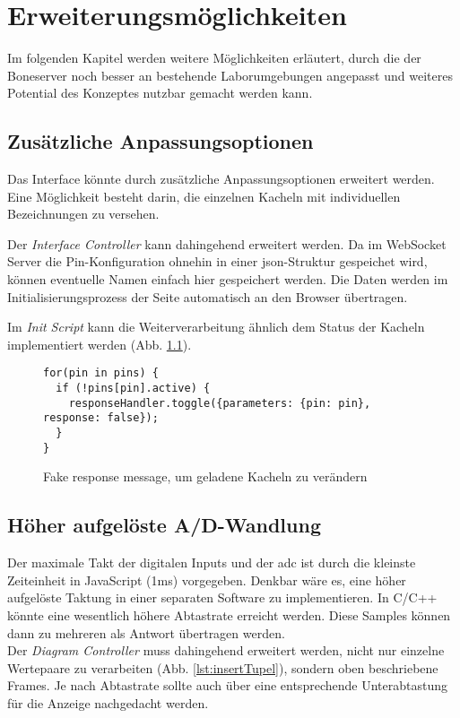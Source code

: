 \documentclass[thesis.tex]{subfiles}
\begin{document}
\chapter{Erweiterungsmöglichkeiten}
Im folgenden Kapitel werden weitere Möglichkeiten erläutert, durch die der Boneserver noch besser an bestehende Laborumgebungen angepasst und weiteres Potential des Konzeptes nutzbar gemacht werden kann.

\section{Zusätzliche Anpassungsoptionen}
Das Interface könnte durch zusätzliche Anpassungsoptionen erweitert werden. Eine Mög\-lich\-keit besteht darin, die einzelnen Kacheln mit individuellen Bezeichnungen zu versehen.

Der \textit{Interface Controller} kann dahingehend erweitert werden. Da im WebSocket Server die Pin-Konfiguration ohnehin in einer \gls{json}-Struktur gespeichet wird, können eventuelle Namen einfach hier gespeichert werden. Die Daten werden im Initialisierungsprozess der Seite automatisch an den Browser übertragen.

Im \textit{Init Script} kann die Weiterverarbeitung ähnlich dem Status der Kacheln implementiert werden (Abb. \ref{lst:fakeResponseMessage}).

\begin{figure}[H]
\begin{lstlisting}
for(pin in pins) {
  if (!pins[pin].active) {
    responseHandler.toggle({parameters: {pin: pin}, response: false});
  }
}
\end{lstlisting}
\caption{Fake response message, um geladene Kacheln zu verändern}
\label{lst:fakeResponseMessage}
\end{figure}


\section{Höher aufgelöste A/D-Wandlung}
Der maximale Takt der digitalen Inputs und der \gls{adc} ist durch die kleinste Zeiteinheit in JavaScript (1ms) vorgegeben. Denkbar wäre es, eine höher aufgelöste Taktung in einer separaten Software zu implementieren. In C/C++ könnte eine wesentlich höhere Ab\-tast\-rate erreicht werden. Diese Samples können dann zu mehreren als Antwort übertragen werden.\\

Der \textit{Diagram Controller} muss dahingehend erweitert werden, nicht nur einzelne Wertepaare zu verarbeiten (Abb. \ref{lst:insertTupel}), sondern oben beschriebene Frames. Je nach Abtastrate sollte auch über eine entsprechende Unterabtastung für die Anzeige nachgedacht werden.
\end{document}
